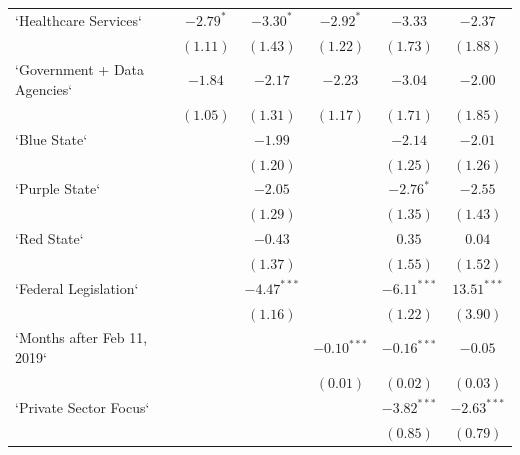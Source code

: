 \begin{table}
\begin{center}
\begin{tabular}{l c c c c c}
`Healthcare Services`                             & $-2.79^{*}$  & $-3.30^{*}$   & $-2.92^{*}$   & $-3.33$       & $-2.37$       \\
                                                  & $(1.11)$     & $(1.43)$      & $(1.22)$      & $(1.73)$      & $(1.88)$      \\
`Government + Data Agencies`                      & $-1.84$      & $-2.17$       & $-2.23$       & $-3.04$       & $-2.00$       \\
                                                  & $(1.05)$     & $(1.31)$      & $(1.17)$      & $(1.71)$      & $(1.85)$      \\
`Blue State`                                      &              & $-1.99$       &               & $-2.14$       & $-2.01$       \\
                                                  &              & $(1.20)$      &               & $(1.25)$      & $(1.26)$      \\
`Purple State`                                    &              & $-2.05$       &               & $-2.76^{*}$   & $-2.55$       \\
                                                  &              & $(1.29)$      &               & $(1.35)$      & $(1.43)$      \\
`Red State`                                       &              & $-0.43$       &               & $0.35$        & $0.04$        \\
                                                  &              & $(1.37)$      &               & $(1.55)$      & $(1.52)$      \\
`Federal Legislation`                             &              & $-4.47^{***}$ &               & $-6.11^{***}$ & $13.51^{***}$ \\
                                                  &              & $(1.16)$      &               & $(1.22)$      & $(3.90)$      \\
`Months after Feb 11, 2019`                       &              &               & $-0.10^{***}$ & $-0.16^{***}$ & $-0.05$       \\
                                                  &              &               & $(0.01)$      & $(0.02)$      & $(0.03)$      \\
`Private Sector Focus`                            &              &               &               & $-3.82^{***}$ & $-2.63^{***}$ \\
                                                  &              &               &               & $(0.85)$      & $(0.79)$      \\

\end{tabular}
\end{center}
\end{table}
